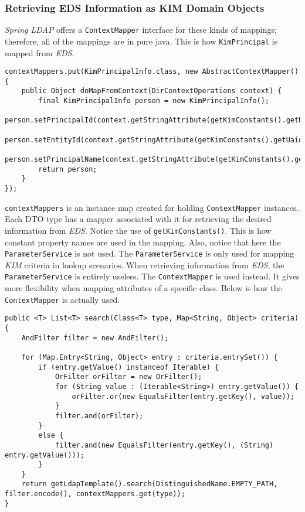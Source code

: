 \documentclass[12pt,notitlepage]{article}
\begin{document}
\subsubsection{Retrieving EDS Information as KIM Domain Objects}
\emph{Spring LDAP} offers a \verb|ContextMapper| interface for these kinds of mappings; therefore, all of the
mappings are in pure java. This is how \verb|KimPrincipal| is mapped from \emph{EDS}.

\begin{lstlisting}
contextMappers.put(KimPrincipalInfo.class, new AbstractContextMapper() {
    public Object doMapFromContext(DirContextOperations context) {
        final KimPrincipalInfo person = new KimPrincipalInfo();
        person.setPrincipalId(context.getStringAttribute(getKimConstants().getUaidEdsProperty()));
        person.setEntityId(context.getStringAttribute(getKimConstants().getUaidEdsProperty()));
        person.setPrincipalName(context.getStringAttribute(getKimConstants().getUidEdsProperty()));
        return person;
    }
});
\end{lstlisting}

\verb|contextMappers| is an instance map created for holding \verb|ContextMapper| instances. Each DTO type
has a mapper associated with it for retrieving the desired information from \emph{EDS}. Notice the use of
\verb|getKimConstants()|. This is how constant property names are used in the mapping. Also, notice that here the 
\verb|ParameterService| is not used. The \verb|ParameterService| is only used for mapping \emph{KIM} criteria
in lookup scenarios. When retrieving information from \emph{EDS}, the \verb|ParameterService| is entirely
useless. The \verb|ContextMapper| is used instead. It gives more flexibility when mapping attributes
of a specific class. Below is how the \verb|ContextMapper| is actually used.

\begin{lstlisting}
public <T> List<T> search(Class<T> type, Map<String, Object> criteria) {
    AndFilter filter = new AndFilter();
    
    for (Map.Entry<String, Object> entry : criteria.entrySet()) {
        if (entry.getValue() instanceof Iterable) {
            OrFilter orFilter = new OrFilter();
            for (String value : (Iterable<String>) entry.getValue()) {
                orFilter.or(new EqualsFilter(entry.getKey(), value));
            }
            filter.and(orFilter);
        }
        else {
            filter.and(new EqualsFilter(entry.getKey(), (String) entry.getValue()));
        }
    }
    return getLdapTemplate().search(DistinguishedName.EMPTY_PATH, filter.encode(), contextMappers.get(type));
}
\end{lstlisting}
\end{document}
